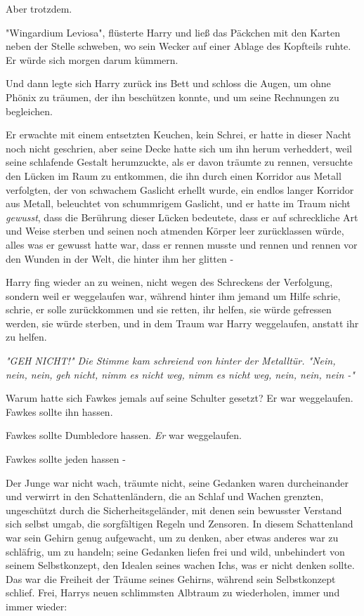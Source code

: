 {Aber trotzdem.

"Wingardium Leviosa", flüsterte Harry und ließ das Päckchen mit den Karten neben der Stelle schweben, wo sein Wecker auf einer Ablage des Kopfteils ruhte. Er würde sich morgen darum kümmern.

Und dann legte sich Harry zurück ins Bett und schloss die Augen, um ohne Phönix zu träumen, der ihn beschützen konnte, und um seine Rechnungen zu begleichen.

Er erwachte mit einem entsetzten Keuchen, kein Schrei, er hatte in dieser Nacht noch nicht geschrien, aber seine Decke hatte sich um ihn herum verheddert, weil seine schlafende Gestalt herumzuckte, als er davon träumte zu rennen, versuchte den Lücken im Raum zu entkommen, die ihn durch einen Korridor aus Metall verfolgten, der von schwachem Gaslicht erhellt wurde, ein endlos langer Korridor aus Metall, beleuchtet von schummrigem Gaslicht, und er hatte im Traum nicht \emph{gewusst}, dass die Berührung dieser Lücken bedeutete, dass er auf schreckliche Art und Weise sterben und seinen noch atmenden Körper leer zurücklassen würde, alles was er gewusst hatte war, dass er rennen musste und rennen und rennen vor den Wunden in der Welt, die hinter ihm her glitten -

Harry fing wieder an zu weinen, nicht wegen des Schreckens der Verfolgung, sondern weil er weggelaufen war, während hinter ihm jemand um Hilfe schrie, schrie, er solle zurückkommen und sie retten, ihr helfen, sie würde gefressen werden, sie würde sterben, und in dem Traum war Harry weggelaufen, anstatt ihr zu helfen.

\emph{\emph{"GEH NICHT!" Die Stimme kam schreiend von hinter der Metalltür. "Nein, nein, nein, geh nicht, nimm es nicht weg, nimm es nicht weg, nein, nein, nein} \emph{-"}}

Warum hatte sich Fawkes jemals auf seine Schulter gesetzt? Er war weggelaufen. Fawkes sollte ihn hassen.

Fawkes sollte Dumbledore hassen. \emph{Er} war weggelaufen.

Fawkes sollte jeden hassen -

Der Junge war nicht wach, träumte nicht, seine Gedanken waren durcheinander und verwirrt in den Schattenländern, die an Schlaf und Wachen grenzten, ungeschützt durch die Sicherheitsgeländer, mit denen sein bewusster Verstand sich selbst umgab, die sorgfältigen Regeln und Zensoren. In diesem Schattenland war sein Gehirn genug aufgewacht, um zu denken, aber etwas anderes war zu schläfrig, um zu handeln; seine Gedanken liefen frei und wild, unbehindert von seinem Selbstkonzept, den Idealen seines wachen Ichs, was er nicht denken sollte. Das war die Freiheit der Träume seines Gehirns, während sein Selbstkonzept schlief. Frei, Harrys neuen schlimmsten Albtraum zu wiederholen, immer und immer wieder:

}

